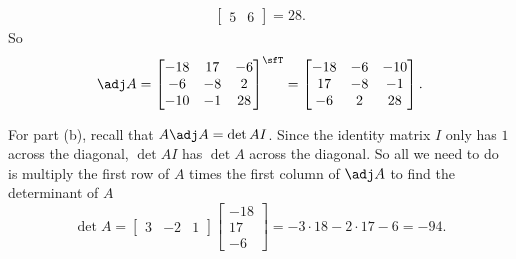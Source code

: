 \begin{questions}
\begin{solution}
\begin{align*}
\begin{bmatrix}
        5&6
      \end{bmatrix}=28.
    \end{align*}
    So
    \[
      \adj A=
      \begin{bmatrix}
        -18&17&-6\\
        -6&-8&2\\
        -10&-1&28\\
      \end{bmatrix}^\sfT
      =
      \begin{bmatrix}
        -18&-6&-10\\
        17&-8&-1\\
        -6&2&28
      \end{bmatrix}.
    \]

    For part (b), recall that $A\adj A=\det A I$. Since the identity matrix
    $I$ only has $1$ across the diagonal, $\det A I$ has $\det A$ across
    the diagonal. So all we need to do is multiply the first row of $A$
    times the first column of $\adj A$ to find the determinant of $A$
    \[
      \det A=\begin{bmatrix}3&-2&1\end{bmatrix}
      \begin{bmatrix}-18\\17\\-6\end{bmatrix}
      =-3\cdot 18-2\cdot 17-6=-94.
    \]
  \end{solution}
\end{questions}

